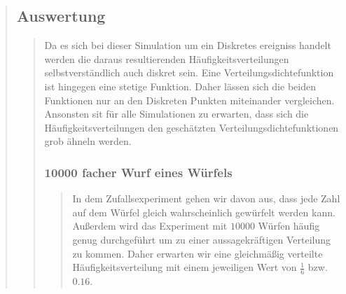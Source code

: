 \begin{quote}
	\subsection{Auswertung}
    \begin{quote}
        Da es sich bei dieser Simulation um ein Diskretes ereigniss handelt werden die daraus resultierenden
        Häufigkeitsverteilungen selbstverständlich auch diskret sein. Eine Verteilungsdichtefunktion ist hingegen eine
        stetige Funktion. Daher lässen sich die beiden Funktionen nur an den Diskreten Punkten miteinander
        vergleichen.\\
        Ansonsten sit für alle Simulationen zu erwarten, dass sich die Häufigkeitsverteilungen den geschätzten
        Verteilungsdichtefunktionen grob ähneln werden.
        
        \subsubsection{10000 facher Wurf eines Würfels}
        \begin{quote}
                In dem Zufallsexperiment gehen wir davon aus, dass jede Zahl auf dem Würfel gleich wahrscheinlich
                gewürfelt werden kann. Außerdem wird das Experiment mit $10000$ Würfen häufig genug durchgeführt um zu
                einer aussagekräftigen Verteilung zu kommen. Daher erwarten wir eine gleichmäßig verteilte
                Häufigkeitsverteilung mit einem jeweiligen Wert von $\frac{1}{6}$ bzw. $0.16$.\\
                

\end{quote}
\end{quote}
\end{quote}
